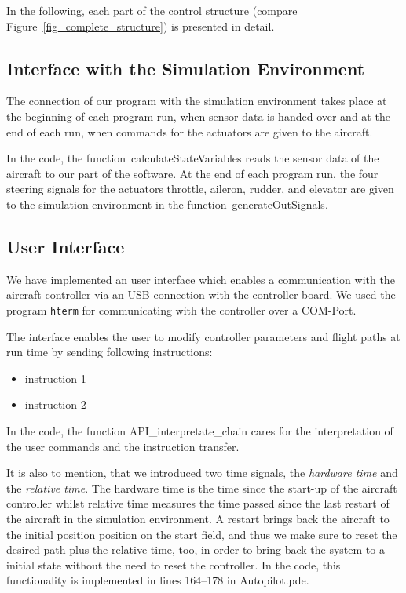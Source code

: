 \documentclass[11pt,a4paper]{scrartcl}		%
\begin{document}
In the following, each part of the control structure (compare Figure~\ref{fig_complete_structure}) is presented in detail.

\medskip





\subsection{Interface with the Simulation Environment}

The connection of our program with the simulation environment takes place at the beginning of each program run, when sensor data is handed over and at the end of each run, when commands for the actuators are given to the aircraft.

In the code, the function~\textsf{calculateStateVariables} reads the sensor data of the aircraft to our part of the software.
At the end of each program run, the four steering signals for the actuators throttle, aileron, rudder, and elevator are given to the simulation environment in the function~\textsf{generateOutSignals}.

\medskip




\subsection{User Interface}

We have implemented an user interface which enables a communication with the aircraft controller via an USB connection with the controller board. 
We used the program \texttt{hterm} for communicating with the controller over a COM-Port.

The interface enables the user to modify controller parameters and flight paths at run time by sending following instructions:

\begin{itemize}
\item 
instruction 1
\item
instruction 2
\end{itemize}

In the code, the function \textsf{API\_interpretate\_chain} cares for the interpretation of the user commands and the instruction transfer.

\bigskip

It is also to mention, that we introduced two time signals, the \textsl{hardware time} and the \textsl{relative time}.
The hardware time is the time since the start-up of the aircraft controller whilst relative time measures the time passed since the last restart of the aircraft in the simulation environment.
A restart brings back the aircraft to the initial position position on the start field, and thus we make sure to reset the desired path plus the relative time, too, in order to bring back the system to a initial state without the need to reset the controller.
In the code, this functionality is implemented in lines 164--178 in \textsf{Autopilot.pde}.
\end{document}
